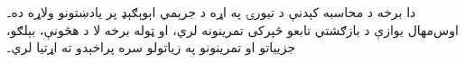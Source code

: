 \documentclass[../../include/open-logic-part]{subfiles}
\begin{document}

\begin{editorial}
  دا برخه د محاسبه کېدنې د تيورۍ په اړه د جرېمي اېوېګېډ پر يادښتونو
  ولاړه ده۔ اوس‌مهال يوازې د بازګشتي تابعو څپرکی تمرينونه لري، او
  ټوله برخه لا د هڅونې، بېلګو، جزيياتو او تمرينونو په زياتولو سره
  پراخېدو ته اړتيا لري۔
\end{editorial}



\OLEndPartHook
\end{document}
